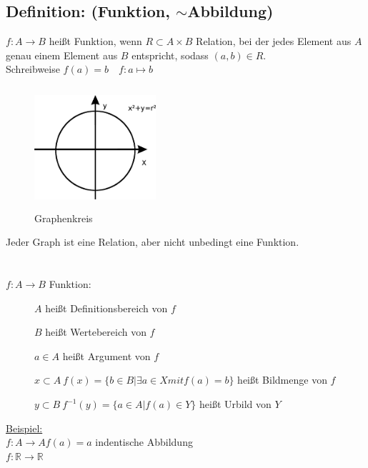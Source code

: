 \subsection{Definition: (Funktion,  $\sim$Abbildung)}
$f: A \rightarrow B$ heißt Funktion, wenn $R\subset A\times B$ Relation, bei der jedes Element aus $A$ genau einem Element aus $B$ entspricht, sodass $(a,b)\in R$.\\
Schreibweise $f(a)=b \quad f:a\mapsto b$\\
%
\begin{figure} [H]
	\centering 
	\includegraphics[width=4.5cm, height=4.5cm]{mainmatter/chapter0/pics/graphenkreis.png}
	\caption{Graphenkreis} 
\end{figure}
Jeder Graph ist eine Relation, aber nicht unbedingt eine Funktion.\\
\qquad\\
\qquad\\
%
$f: A\rightarrow B$ Funktion:
\begin{description}
	\item [] $A$ heißt Definitionsbereich von $f$
	\item [] $B$ heißt Wertebereich von $f$
	\item [] $a \in A$ heißt Argument von $f$
	\item [] $x \subset A ~ f(x)=\{b \in B|\exists a \in X mit f(a)=b\}$ heißt Bildmenge 
		von	$f$
	\item [] $y\subset B ~ f^{-1}(y)=\{a \in A| f(a) \in Y\}$ heißt Urbild von $Y$
\end{description}
\underline{Beispiel: }\\
$f: A \rightarrow A f(a) = a$ indentische Abbildung\\
$f: \mathbb{R} \rightarrow \mathbb{R}$
%
%
%
